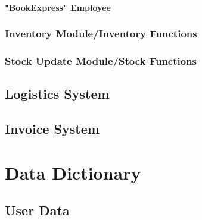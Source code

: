 \documentclass[11pt,a4paper,oneside,svgnames]{report}
\begin{document}
\subsubsection{"BookExpress" Employee}

\subsection{Inventory Module/Inventory Functions}

\subsection{Stock Update Module/Stock Functions}

\section{Logistics System}

\section{Invoice System}


\chapter{Data Dictionary}

\section{User Data}
\end{document}
